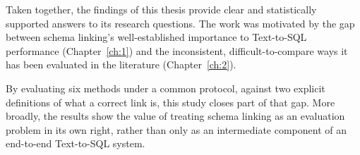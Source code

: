 Taken together, the findings of this thesis provide clear and statistically supported answers to its research questions. The work was motivated by the gap between schema linking's well-established importance to Text-to-SQL performance (Chapter~\ref{ch:1}) and the inconsistent, difficult-to-compare ways it has been evaluated in the literature (Chapter~\ref{ch:2}).

By evaluating six methods under a common protocol, against two explicit definitions of what a correct link is, this study closes part of that gap. More broadly, the results show the value of treating schema linking as an evaluation problem in its own right, rather than only as an intermediate component of an end-to-end Text-to-SQL system.

